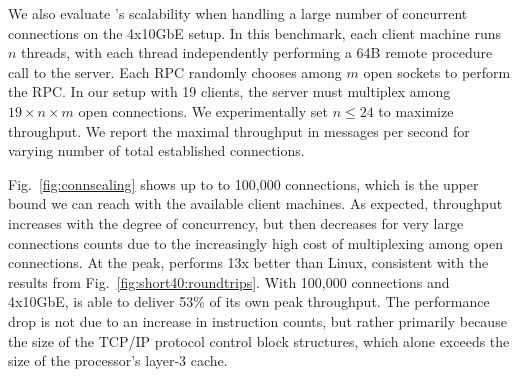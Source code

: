 \label{sec:eval:scale}

We also evaluate \ix's scalability when handling a large number of
concurrent connections on the 4x10GbE setup. In this benchmark, each client machine runs
$n$ threads, with each thread independently performing a 64B remote
procedure call to the server.  Each RPC randomly chooses among $m$
open sockets to perform the RPC.  In our setup with 19 clients, the
server must multiplex among $19 \times n \times m$ open connections.
We experimentally set $n \leq 24$ to maximize throughput.  We report
the maximal throughput in messages per second for varying number of
total established connections.



Fig.~\ref{fig:connscaling} shows up to to 100,000 connections, which
is the upper bound we can reach with the available client machines.
As expected, throughput increases with the degree of concurrency, but
then decreases for very large connections counts due to the
increasingly high cost of multiplexing among open connections.  At the
peak, \ix performs 13x better than Linux, consistent with the results
from Fig.~\ref{fig:short40:roundtrips}.  With 100,000 connections and
4x10GbE, \ix is able to deliver 53\% of its own peak throughput.  The
performance drop is not due to an increase in instruction counts, but
rather primarily because the size of the TCP/IP protocol control block
structures, which alone exceeds the size of the processor's layer-3
cache.


